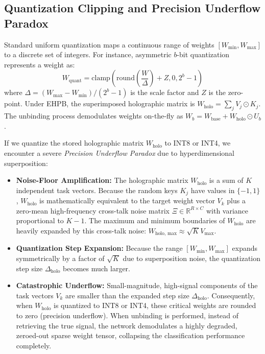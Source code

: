 \documentclass{article}
\theoremstyle{plain}
\theoremstyle{definition}
\theoremstyle{remark}
\begin{document}
\subsection{Quantization Clipping and Precision Underflow Paradox}
Standard uniform quantization maps a continuous range of weights $[W_{\text{min}}, W_{\text{max}}]$ to a discrete set of integers. For instance, asymmetric $b$-bit quantization represents a weight as:
\begin{equation}
W_{\text{quant}} = \text{clamp} \left( \text{round} \left( \frac{W}{\Delta} \right) + Z, 0, 2^b - 1 \right)
\end{equation}
where $\Delta = (W_{\text{max}} - W_{\text{min}}) / (2^b - 1)$ is the scale factor and $Z$ is the zero-point. Under EHPB, the superimposed holographic matrix is $W_{\text{holo}} = \sum_j V_j \odot K_j$. The unbinding process demodulates weights on-the-fly as $W_b = W_{\text{base}} + W_{\text{holo}} \odot U_b$. 

If we quantize the stored holographic matrix $W_{\text{holo}}$ to INT8 or INT4, we encounter a severe \textit{Precision Underflow Paradox} due to hyperdimensional superposition:
\begin{itemize}
\item \textbf{Noise-Floor Amplification:} The holographic matrix $W_{\text{holo}}$ is a sum of $K$ independent task vectors. Because the random keys $K_j$ have values in $\{-1, 1\}$, $W_{\text{holo}}$ is mathematically equivalent to the target weight vector $V_k$ plus a zero-mean high-frequency cross-talk noise matrix $\Xi \in \mathbb{R}^{R \times C}$ with variance proportional to $K-1$. The maximum and minimum boundaries of $W_{\text{holo}}$ are heavily expanded by this cross-talk noise: $W_{\text{holo, max}} \approx \sqrt{K} V_{\text{max}}$.
\item \textbf{Quantization Step Expansion:} Because the range $[W_{\text{min}}, W_{\text{max}}]$ expands symmetrically by a factor of $\sqrt{K}$ due to superposition noise, the quantization step size $\Delta_{\text{holo}}$ becomes much larger. 
\item \textbf{Catastrophic Underflow:} Small-magnitude, high-signal components of the task vectors $V_k$ are smaller than the expanded step size $\Delta_{\text{holo}}$. Consequently, when $W_{\text{holo}}$ is quantized to INT8 or INT4, these critical weights are rounded to zero (precision underflow). When unbinding is performed, instead of retrieving the true signal, the network demodulates a highly degraded, zeroed-out sparse weight tensor, collapsing the classification performance completely.
\end{itemize}
\end{document}
